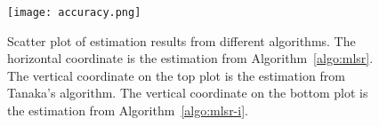 \documentclass{article}
\begin{document}
\begin{figure}
  \begin{center}
    \texttt{[image: accuracy.png]}
  \end{center}
  \caption{Scatter plot of estimation results from different algorithms.
    The horizontal coordinate is the estimation from
    Algorithm~\ref{algo:mlsr}.  The vertical coordinate on the top
    plot is the estimation from Tanaka's algorithm\cite{qiskit_aewoqft}.
    The vertical coordinate on the bottom plot is the estimation from
    Algorithm~\ref{algo:mlsr-i}.}
  \label{fig:accuracy}
\end{figure}





\end{document}
